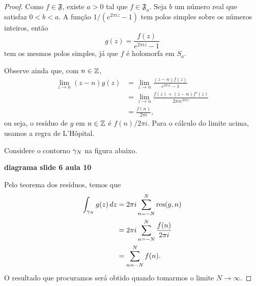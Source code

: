         \begin{proof}
            Como $f\in\mathfrak{F}$, existe $a > 0$ tal que $f\in\mathfrak{F}_a$. Seja 
            $b$ um número real que satisfaz $0<b<a$. A função $1/(e^{2\pi i z} - 1)$ 
            tem polos simples sobre os números inteiros, então
            \begin{equation*}
                g(z) = \frac{f(z)}{e^{2\pi i z} - 1}
            \end{equation*}
            tem os mesmos polos simples, já que $f$ é holomorfa em $S_a$. 
            
            Observe ainda que, com $n \in \mathbb{Z}$,
            \begin{align*}
                \lim_{z \to n} (z-n)g(z) & = \lim_{z \to n} \frac{(z-n)f(z)}{e^{2\pi i z} - 1}\\
                &= \lim_{z \to n} \frac{f(z) + (z-n)f'(z)}{2\pi ie^{2\pi i z}} \\
                &= \frac{f(n)}{2\pi i},
            \end{align*}
            ou seja, o resíduo de $g$ em $n \in \mathbb{Z}$ é $f(n)/2\pi i$. Para o cálculo do limite acima,
            usamos a regra de L'Hôpital.
            
            Considere o contorno $\gamma_N$ na figura abaixo. 
            \begin{center}
                {\bf diagrama slide 6 aula 10}
            \end{center}
            Pelo teorema dos resíduos, temos que 
            \begin{align*}
                \int_{\gamma_N}g(z)\,dz &= 2\pi i\sum_{n=-N}^{N}\operatorname{res}(g,n)\\
                &= 2 \pi i\sum_{n=-N}^{N}\frac{f(n)}{2 \pi i}\\
                &= \sum_{n=-N}^{N}f(n).
            \end{align*}
            O resultado que procuramos será obtido quando tomarmos o limite $N \to \infty$. 
            

\end{proof}
